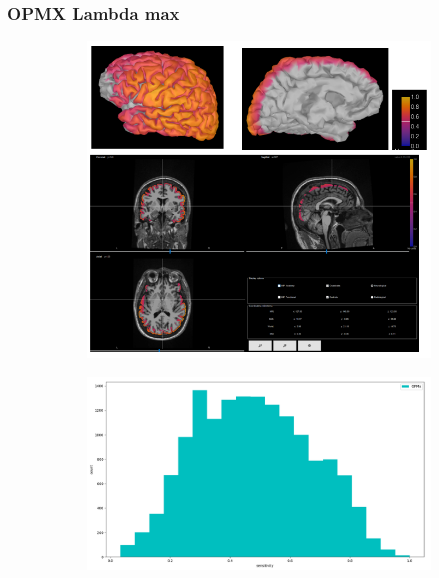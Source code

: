\documentclass{beamer}
\numberwithin{figure}{section}
\numberwithin{equation}{section}
\begin{document}






\section{}
\begin{frame}
 \frametitle{OPMX Lambda max}
  

 	\begin{figure}[h]
        \begin{subfigure}[h]{0.53\linewidth} 
            \includegraphics[width=\linewidth]{pictures/OPMX1}
            \label{fig:rdf_graph}
        \end{subfigure}       
        \begin{subfigure}[h]{0.45\linewidth} 
            \includegraphics[width=\linewidth]{pictures/opmx0}
            \label{fig:rdfs_graph}
        \end{subfigure}
    \end{figure}

  
\end{frame}
\end{document}
